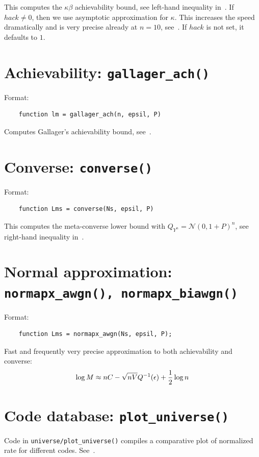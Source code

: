 \documentclass[a4paper,11p]{memoir}
\def\matn{\mathcal{N}}
\begin{document}
This computes the $\kappa\beta$ achievability bound, see left-hand inequality in~\cite[(218)]{PPV08}. If $hack\neq 0$, then we
use asymptotic approximation for $\kappa$. This increases the speed dramatically and is very precise already at $n=10$,
see~\cite[(217)]{PPV08}. If $hack$ is not set, it defaults to $1$.

\section{Achievability: \texttt{gallager\_ach()}}
Format:
\begin{verbatim}
	function lm = gallager_ach(n, epsil, P)
\end{verbatim}

Computes Gallager's achievability bound, see~\cite[(44)]{PPV08}.

\section{Converse: \texttt{converse()}}
Format:
\begin{verbatim}
	function Lms = converse(Ns, epsil, P)
\end{verbatim}

This computes the meta-converse lower bound with $Q_{Y^n} = \matn(0, 1+P)^n$, see right-hand inequality in~\cite[(218)]{PPV08}. 


\section{Normal approximation: \texttt{normapx\_awgn(), normapx\_biawgn()}}

Format:
\begin{verbatim}
	function Lms = normapx_awgn(Ns, epsil, P);
\end{verbatim}

Fast and frequently very precise approximation to both achievability and converse:
	$$ \log M \approx n C - \sqrt{nV} Q^{-1}(\epsilon) + {1\over2} \log n $$


\section{Code database: \texttt{plot\_universe()}}

Code in \verb|universe/plot_universe()| compiles a comparative plot of normalized rate for different codes.
See~\cite[Section IV.D]{PPV08}.
\end{document}
